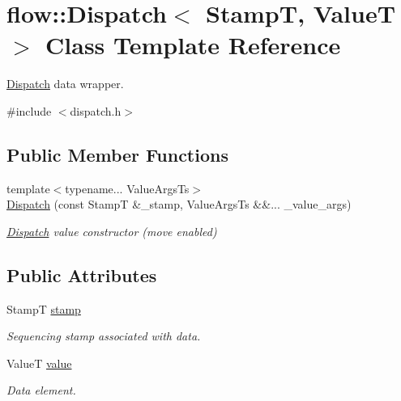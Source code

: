\hypertarget{classflow_1_1_dispatch}{}\section{flow\+:\+:Dispatch$<$ StampT, ValueT $>$ Class Template Reference}
\label{classflow_1_1_dispatch}


\hyperlink{classflow_1_1_dispatch}{Dispatch} data wrapper.  




{\ttfamily \#include $<$dispatch.\+h$>$}

\subsection*{Public Member Functions}
\begin{DoxyCompactItemize}
\item 
\mbox{\label{classflow_1_1_dispatch_a1131f6fb814e7f4ac55108c9971f19cf}} 
{\footnotesize template$<$typename... Value\+Args\+Ts$>$ }\\\hyperlink{classflow_1_1_dispatch_a1131f6fb814e7f4ac55108c9971f19cf}{Dispatch} (const StampT \&\+\_\+stamp, Value\+Args\+Ts \&\&... \+\_\+value\+\_\+args)
\begin{DoxyCompactList}\small\item\em \hyperlink{classflow_1_1_dispatch}{Dispatch} value constructor (move enabled) \end{DoxyCompactList}\end{DoxyCompactItemize}
\subsection*{Public Attributes}
\begin{DoxyCompactItemize}
\item 
\mbox{\label{classflow_1_1_dispatch_aba36922397c417ba5da2858327463732}} 
StampT \hyperlink{classflow_1_1_dispatch_aba36922397c417ba5da2858327463732}{stamp}
\begin{DoxyCompactList}\small\item\em Sequencing stamp associated with data. \end{DoxyCompactList}\item 
\mbox{\label{classflow_1_1_dispatch_ae4a044a9ec7c77362bfac2319faa0652}} 
ValueT \hyperlink{classflow_1_1_dispatch_ae4a044a9ec7c77362bfac2319faa0652}{value}
\begin{DoxyCompactList}\small\item\em Data element. \end{DoxyCompactList}\end{DoxyCompactItemize}



